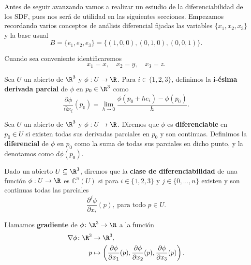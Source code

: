 Antes de seguir avanzando vamos a realizar un estudio de la diferenciabilidad de los SDF, pues nos será de utilidad en las siguientes secciones. Empezamos recordando varios conceptos de análisis diferencial \cite{diff} fijadas las variables $\{x_1,x_2,x_3\}$ y la base usual $$B=\{e_1,e_2,e_3\} = \{(1,0,0),(0,1,0),(0,0,1)\}.$$

Cuando sea conveniente identificaremos
\begin{equation*}
    x_1=x,\quad x_2=y,\quad x_3 = z.
\end{equation*}

\begin{definicion}\label{def:parcial}
    Sea $U$ un abierto de $\R^3$ y $\phi: U \to \R$. Para $i\in \{1,2,3\}$, definimos la \textbf{$\boldsymbol{i}$-ésima derivada parcial} de $\phi$ en $p_0\in\R^3$ como
    \begin{equation*}
        \frac{\partial \phi}{\partial x_i}(p_0) = \lim_{h\to 0}\frac{\phi(p_0+he_i) - \phi(p_0)}{h}.
    \end{equation*}
\end{definicion}

\begin{definicion}
    Sea $U$ un abierto de $\R^3$ y $\phi: U \to \R$. Diremos que $\phi$ es \textbf{diferenciable} en $p_0 \in U$ si existen todas sus derivadas parciales en $p_0$ y son continuas. Definimos la \textbf{diferencial} de $\phi$ en $p_0$ como la suma de todas sus parciales en dicho punto, y la denotamos como $d\phi(p_0)$.

\end{definicion}

\begin{definicion}
    Dado un abierto $U\subseteq \R^3$, diremos que la \textbf{clase de diferenciabilidad} de una función $\phi:U\to \R$ es $\mathbb{C}^n(U)$ si para $i\in \{1,2,3\}$ y $j\in \{0,\dots, n\}$ existen y son continuas todas las parciales
    \begin{equation*}
        \frac{\partial^j \phi}{\partial x_i}(p),\ \text{para todo } p\in U.
    \end{equation*}
\end{definicion}

\begin{definicion}
  Llamamos \textbf{gradiente} de $\phi\colon \R^3\to\R$ a la función
  \begin{align*}
      \nabla\phi\colon \R^3 &\to \R^3,\\
      p &\mapsto \left(\frac{\partial \phi}{\partial x_1}(p), \frac{\partial \phi}{\partial x_2}(p), \frac{\partial \phi}{\partial x_3}(p)\right).
  \end{align*}
\end{definicion}

